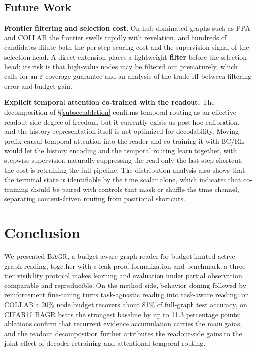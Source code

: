 \documentclass{article}
\begin{document}
\subsection{Future Work}
\label{subsec:future}

\textbf{Frontier filtering and selection cost.} On hub-dominated graphs such as PPA and COLLAB the frontier swells rapidly with revelation, and hundreds of candidates dilute both the per-step scoring cost and the supervision signal of the selection head. A direct extension places a lightweight \textbf{filter} before the selection head; its risk is that high-value nodes may be filtered out prematurely, which calls for an $\varepsilon$-coverage guarantee and an analysis of the trade-off between filtering error and budget gain.

\textbf{Explicit temporal attention co-trained with the readout.} The decomposition of \S\ref{subsec:ablation} confirms temporal routing as an effective readout-side degree of freedom, but it currently exists as post-hoc calibration, and the history representation itself is not optimized for decodability. Moving prefix-causal temporal attention into the reader and co-training it with BC/RL would let the history encoding and the temporal routing learn together, with stepwise supervision naturally suppressing the read-only-the-last-step shortcut; the cost is retraining the full pipeline. The distribution analysis also shows that the terminal state is identifiable by the time scalar alone, which indicates that co-training should be paired with controls that mask or shuffle the time channel, separating content-driven routing from positional shortcuts.

\section{Conclusion}
\label{sec:conclusion}

We presented BAGR, a budget-aware graph reader for budget-limited active graph reading, together with a leak-proof formalization and benchmark: a three-tier visibility protocol makes learning and evaluation under partial observation comparable and reproducible. On the method side, behavior cloning followed by reinforcement fine-tuning turns task-agnostic reading into task-aware reading: on COLLAB a 20\% node budget recovers about 81\% of full-graph test accuracy, on CIFAR10 BAGR beats the strongest baseline by up to 11.3 percentage points; ablations confirm that recurrent evidence accumulation carries the main gains, and the readout decomposition further attributes the readout-side gains to the joint effect of decoder retraining and attentional temporal routing.
\end{document}
